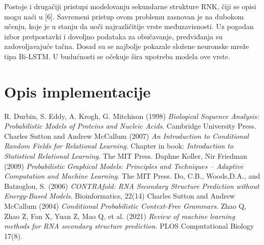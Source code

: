 \documentclass[a4paper, 12pt]{article}
\begin{document}
Postoje i drugačiji pristupi modelovanju sekundarne strukture RNK, čiji se opisi mogu naći u [6]. Savremeni pristup ovom problemu zasnovan je na dubokom učenju, koje je u stanju da uoči najrazličitije vrste međuzavisnosti. Uz pogodan izbor pretpostavki i dovoljno podataka za obučavanje, predviđanja su zadovoljavajuće tačna. Dosad su se najbolje pokazale složene neuronske mreže tipa Bi-LSTM. U budućnosti se očekuje šira upotreba modela ove vrste.


\section{Opis implementacije}

\newpage 

\begin{thebibliography}{9}
\bibitem{} R. Durbin, S. Eddy, A. Krogh, G. Mitchison (1998) \textit{Biological Sequence Analysis: Probabilistic Models of Proteins and Nucleic Acids}. Cambridge University Press.
\bibitem{} Charles Sutton and Andrew McCallum (2007) \textit{An Introduction to Conditional Random Fields for Relational Learning}. Chapter in book: \textit{Introduction to Statistical Relational Learning}. The MIT Press.
\bibitem{} Daphne Koller, Nir Friedman (2009) \textit{Probabilistic Graphical Models: Principles and Techniques -- Adaptive Computation and Machine Learning}. The MIT Press.
\bibitem{} Do, C.B., Woods,D.A., and Batzoglou, S. (2006) \textit{CONTRAfold: RNA Secondary Structure Prediction without Energy-Based Models}. Bioinformatics, 22(14)
\bibitem{} Charles Sutton and Andrew McCallum (2004) \textit{Conditional Probabilistic Context-Free Grammars}.
\bibitem{} Zhao Q, Zhao Z, Fan X, Yuan Z, Mao Q, et al. (2021) \textit{Review of machine learning methods for RNA secondary structure prediction}. PLOS Computational Biology 17(8).
\end{thebibliography}
\end{document}
